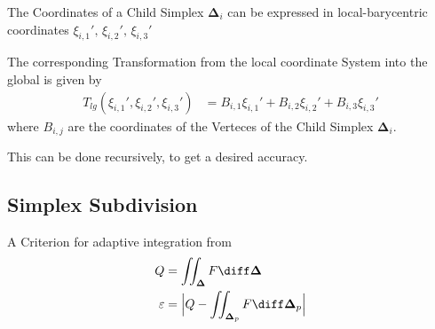 \documentclass{mitschrift}
\newcommand{\simplex}{\boldsymbol{\Delta}}
\begin{document}
The Coordinates of a Child Simplex $\simplex_i$ can be expressed in local-barycentric coordinates $\xi_{i,1}',\, \xi_{i,2}',\, \xi_{i,3}'$

The corresponding Transformation from the local coordinate System into the global is given by \begin{align}
   T_{lg}(\xi_{i,1}', \xi_{i,2}', \xi_{i,3}') &= B_{i,1}\xi_{i,1}' + B_{i,2}\xi_{i,2}' + B_{i,3} \xi_{i,3}'
\end{align} where $B_{i,j}$ are the coordinates of the Verteces of the Child Simplex $\simplex_i$.

This can be done recursively, to get a desired accuracy.
%



\subsection{Simplex Subdivision}

A Criterion for adaptive integration from \cite{gonnetReviewErrorEstimation2012}\begin{align}
    Q &= \iint_{\simplex} F \diff \simplex \\
    \varepsilon &= \Bigl\vert Q - \iint_{\simplex_p} F \diff \simplex_p \Bigr\vert
\end{align}
\end{document}
